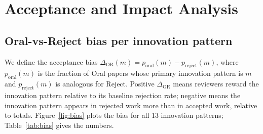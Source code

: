 \documentclass[10pt,a4paper]{article}
\begin{document}
\section{Acceptance and Impact Analysis}
\label{sec:analysis}

\subsection{Oral-vs-Reject bias per innovation pattern}

We define the acceptance bias $\Delta_{\text{OR}}(m) = p_\text{oral}(m) - p_\text{reject}(m)$, where $p_\text{oral}(m)$ is the fraction of Oral papers whose primary innovation pattern is $m$ and $p_\text{reject}(m)$ is analogous for Reject. Positive $\Delta_{\text{OR}}$ means reviewers reward the innovation pattern relative to its baseline rejection rate; negative means the innovation pattern appears in rejected work more than in accepted work, relative to totals. Figure~\ref{fig:bias} plots the bias for all 13 innovation patterns; Table~\ref{tab:bias} gives the numbers.
\end{document}

